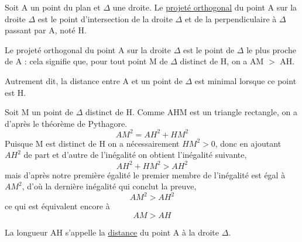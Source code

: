 \documentclass[french]{book}
\begin{document}
\begin{defn}
Soit A un point du plan et $\Delta$ une droite.
Le \underline{projeté orthogonal} du point A sur la droite $\Delta$  est le point d'intersection de la droite $\Delta$ et de la perpendiculaire à $\Delta$ passant par A, noté H.
\end{defn}

\begin{prop}
Le projeté orthogonal du point A sur la droite $\Delta$ est le point de $\Delta$ le plus proche de A : cela signifie que, pour tout point M de $\Delta$ distinct de H, on a AM $>$ AH.
\end{prop}

Autrement dit, la distance entre A et un point de $\Delta$ est minimal lorsque ce point est H.

\begin{demo}
Soit M un point de $\Delta$ distinct de H. Comme AHM est un triangle rectangle, on a d'après le théorème de Pythagore.
$$AM^2=AH^2+HM^2$$ Puisque M est distinct de H on a nécessairement $HM^2>0$, donc en ajoutant $AH^2$ de part et d'autre de l'inégalité on obtient l'inégalité suivante,
$$AH^2+HM^2 > AH^2$$ mais d'après notre première égalité le premier membre de l'inégalité est égal à $AM^2$, d'où la dernière inégalité qui conclut la preuve,
$$AM^2>AH^2$$
ce qui est équivalent encore à 
$$AM>AH$$
\end{demo}


\begin{defn}
La longueur AH s'appelle la \underline{distance} du point A à la droite $\Delta$.
\vspace{4mm}
\end{defn}
\end{document}
